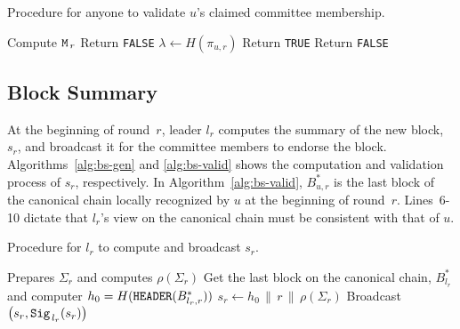 \documentclass{article}
\begin{document}
\begin{algorithm}[H]
\caption{Procedure for anyone to validate $u$'s claimed committee membership.}
\label{alg:committee-valid}
\begin{spacing}{1.2}
\begin{algorithmic}[1]
    \vspace{1ex}
    \State Compute ${\tt M}_{\,r}$
    \vspace{1ex}
        \State Return {\tt FALSE}
    \EndIf
    \vspace{1ex}
    \State $\lambda\leftarrow H(\pi_{u,r})$
    \vspace{1ex}
    \If{$\lambda\leq\epsilon$}
        \State Return {\tt TRUE}
    \Else 
        \State Return {\tt FALSE}
    \EndIf
\end{algorithmic}
\end{spacing}
\end{algorithm}

\subsection{Block Summary}
At the beginning of round~$r$, leader $l_r$ computes the summary of the new block, $s_r$, and broadcast it for the committee members to endorse the block. Algorithms~\ref{alg:bs-gen} and \ref{alg:bs-valid} shows the computation and validation process of $s_r$, respectively. In Algorithm~\ref{alg:bs-valid}, $B_{u,r}^*$ is the last block of the canonical chain locally recognized by $u$ at the beginning of round~$r$. Lines~6-10 dictate that $l_r$'s view on the canonical chain must be consistent with that of $u$.

\begin{algorithm}[H]
\caption{Procedure for $l_r$ to compute and broadcast $s_r$.}
\label{alg:bs-gen}
\begin{spacing}{1.2}
\begin{algorithmic}[1]
    \vspace{1ex}
    \State Prepares $\Sigma_r$ and computes $\rho\left(\Sigma_r\right)$
    \State Get the last block on the canonical chain, $B_{l_r}^*$ and computer $h_0=H({\tt HEADER}(B_{l_r,r}^*))$
    \State $s_r\leftarrow h_0\,\|\,r\,\|\,\rho\left(\Sigma_r\right)$
    \State Broadcast $\left(s_r,{\tt Sig}_{\,l_r}(s_r)\right)$
\end{algorithmic}
\end{spacing}
\end{algorithm}
\end{document}
